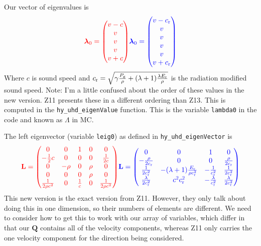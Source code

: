 \documentclass[preprint,11pt]{aastex}
\newcommand{\beq}{\begin{equation}}
\newcommand{\eeq}{\end{equation}}
\begin{document}
Our vector of eigenvalues is
\beq
{\color{red}\boldsymbol{\lambda}_0 = \begin{pmatrix}v - c\\v \\ v \\ v \\ v + c\end{pmatrix}}{\color{blue}\boldsymbol{\lambda}_0 = \begin{pmatrix}v - c_{\rm r}\\v \\ v \\ v \\ v \\ v + c_{\rm r}\end{pmatrix}}
\eeq
Where $c$ is sound speed and $c_{\rm r}=\sqrt{\gamma \frac{P_{\rm g}}{\rho} + (\lambda + 1)\frac{\lambda E_{\rm r}}{\rho}}$ is the radiation modified sound speed.  {\color{blue}Note: I'm a little confused about the order of these values in the new version.  Z11 presents these in a different ordering than Z13.}  This is computed in the \verb!hy_uhd_eigenValue! function.  This is the variable \verb!lambda0! in the code and known as $\Lambda$ in MC.

The left eigenvector (variable \verb!leig0!)  as defined in \verb!hy_uhd_eigenVector! is
\beq
{\color{red}
\mathbf{L} = 
\begin{pmatrix}
0 & 0 & 1 & 0 & 0 \\
-\frac{1}{2} c & 0 & 0 & 0 & \frac{1}{2 c} \\
0 & -\rho & 0 & \rho & 0 \\
0 & 0 & 0 & \rho & 0 \\
\frac{1}{2 \rho c^2} & 0 & \frac{1}{c} & 0 & \frac{1}{2 \rho c^2}
\end{pmatrix}
}
{\color{blue}
\mathbf{L} = 
\begin{pmatrix}
0 & 0 & 1 & 0 \\
-\frac{\rho}{2c_{\rm r}}  & 0 & 0 & \frac{\rho}{2 c_{\rm r}} \\
\frac{1}{2 c_{\rm r}^2}& -(\lambda + 1) \frac{E_{\rm r}}{\rho c_{\rm r}^2}& -\frac{1}{c_{\rm r}^2}&\frac{1}{2c_{\rm r}^2} \\
\frac{\lambda}{2 c_{\rm r}^2}& c^2 c_{\rm r}^2& -\frac{\lambda}{c_{\rm r}^2}&\frac{\lambda}{2 c_{\rm r}^2}
\end{pmatrix}
}
\eeq
{\color{blue} This new version is the exact version from Z11.  However, they only talk about doing this in one dimension, so their numbers of elements are different.  We need to consider how to get this to work with our array of variables, which differ in that our $\mathbf{Q}$ contains all of the velocity components, whereas Z11 only carries the one velocity component for the direction being considered.}
\end{document}
